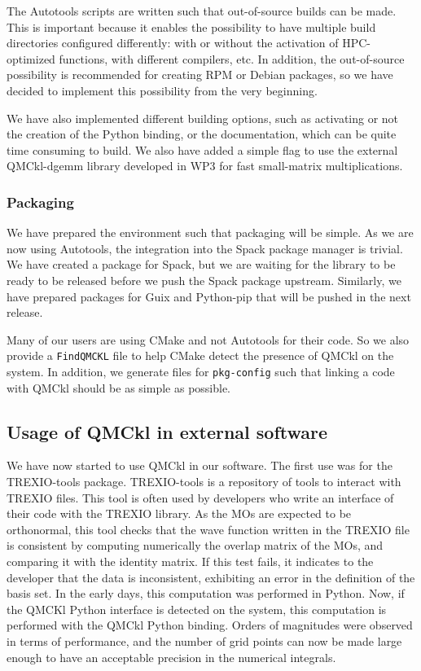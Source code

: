 The Autotools scripts are written such that out-of-source builds can
be made. This is important because it enables the possibility to have
multiple build directories configured differently: with or without the
activation of HPC-optimized functions, with different compilers, etc.
In addition, the out-of-source possibility is recommended for creating RPM
or Debian packages, so we have decided to implement this possibility
from the very beginning.

We have also implemented different building options, such as
activating or not the creation of the Python binding, or the
documentation, which can be quite time consuming to build. We also have
added a simple flag to use the external QMCkl-dgemm library developed in WP3 for
fast small-matrix multiplications.

\subsubsection{Packaging}

We have prepared the environment such that packaging will be
simple. As we are now using Autotools, the integration into the Spack
package manager\cite{spack} is trivial. We have created a package for Spack, but
we are waiting for the library to be ready to be released before we
push the Spack package upstream.
Similarly, we have prepared packages for Guix\cite{guix} and Python-pip that
will be pushed in the next release.

Many of our users are using CMake and not Autotools for their code. So
we also provide a \texttt{FindQMCKL} file to help CMake detect
the presence of QMCkl on the system. In addition, we generate files for
\texttt{pkg-config} such that linking a code with QMCkl should be as
simple as possible.

\subsection{Usage of QMCkl in external software}

We have now started to use QMCkl in our software. The first use was for
the TREXIO-tools package.
TREXIO-tools is a repository of tools to interact with TREXIO files.
This tool is often used by developers who write an interface of their code with
the TREXIO library. As the \acp{MO} are expected to be orthonormal,
this tool checks that the wave function written in the TREXIO file is
consistent by computing numerically the overlap matrix of the \acp{MO}, and
comparing it with the identity matrix. If this test fails, it indicates to the
developer that the data is inconsistent, exhibiting an error in the
definition of the basis set.
In the early days, this computation was performed in Python. Now, if
the QMCKl Python interface is detected on the system, this computation
is performed with the QMCkl Python binding. Orders of magnitudes were
observed in terms of performance, and the number of grid points can
now be made large enough to have an acceptable precision in the
numerical integrals.

